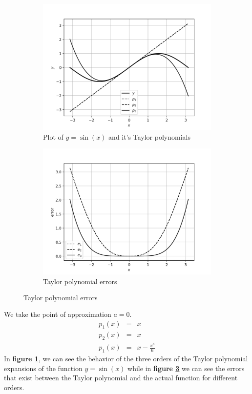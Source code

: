 \documentclass[12,a4paper]{article}
\begin{document}
    \begin{figure}[h!]
        \centering
        \begin{subfigure}[t]{0.49\textwidth}
            \includegraphics[width=\textwidth]{plots/q1p5.png}
            \caption{Plot of $y=\sin(x)$ and it's Taylor polynomials}
            \label{fig:q2a}
        \end{subfigure}
        \begin{subfigure}[t]{0.49\textwidth}
            \includegraphics[width=\textwidth]{plots/q1p6.png}
            \caption{Taylor polynomial errors}
            \label{fig:q2b}
        \end{subfigure}
    \end{figure}
    We take the point of approximation $a = 0$.
    \begin{eqnarray}
        p_1(x) &=& x \nonumber \\
        p_2(x) &=& x \nonumber \\
        p_1(x) &=& x - \frac{x^3}{6} \nonumber
    \end{eqnarray}
    In \textbf{figure \ref{fig:q2a}}, we can see the behavior of the three orders of the Taylor polynomial expansions of the function $y=\sin(x)$ while in \textbf{figure \ref{fig:q2b}} we can see the errors that exist between the Taylor polynomial and the actual function for different orders.
\end{document}
